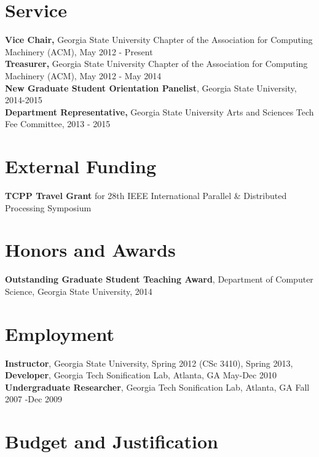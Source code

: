 \documentclass[12pt,a4paper]{article}
\begin{document}
\section*{Service}
{\bf Vice Chair,} Georgia State University Chapter of the Association for Computing Machinery (ACM),  May 2012 - Present\\
{\bf Treasurer,} Georgia State University Chapter of the Association for Computing Machinery (ACM), May 2012 - May 2014\\
{\bf New Graduate Student Orientation Panelist}, Georgia State University, 2014-2015\\
{\bf Department Representative,} Georgia State University Arts and Sciences Tech Fee Committee, 2013 - 2015\\

\section*{External Funding}
\textbf{TCPP Travel Grant} for 28th IEEE International Parallel \& Distributed Processing Symposium

\section*{Honors and Awards}
\textbf{Outstanding Graduate Student Teaching Award}, Department of Computer Science, Georgia State University, 2014

\section*{Employment}
{\bf Instructor}, Georgia State University, Spring 2012 (CSc 3410), Spring 2013,\\
{\bf Developer}, Georgia Tech Sonification Lab, Atlanta, GA May-Dec 2010\\
{\bf Undergraduate Researcher}, Georgia Tech Sonification Lab, Atlanta, GA Fall 2007 -Dec 2009


\newpage 
\section{Budget and Justification}

\begin{table}[h!]


\end{table}
\end{document}
